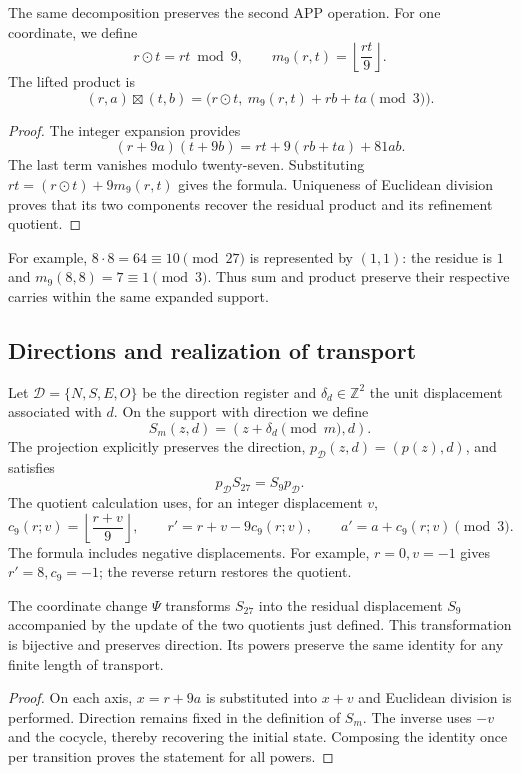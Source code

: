 The same decomposition preserves the second APP operation. For
one coordinate, we define
\[
 r\odot t=rt\bmod9,\qquad
 m_9(r,t)=\left\lfloor\frac{rt}{9}\right\rfloor.
\]
The lifted product is
\begin{equation}
 (r,a)\boxtimes(t,b)
 =\bigl(r\odot t,\ m_9(r,t)+rb+ta\pmod3\bigr).
 \label{eq:app-refinamiento-producto}
\end{equation}
\begin{proof}
The integer expansion provides
\[
 (r+9a)(t+9b)=rt+9(rb+ta)+81ab.
\]
The last term vanishes modulo twenty-seven. Substituting
$rt=(r\odot t)+9m_9(r,t)$ gives the formula. Uniqueness of Euclidean
division proves that its two components recover the residual
product and its refinement quotient.
\end{proof}
For example, $8\cdot8=64\equiv10\pmod{27}$ is represented by
$(1,1)$: the residue is $1$ and
$m_9(8,8)=7\equiv1\pmod3$. Thus sum and product preserve their
respective carries within the same expanded support.

\subsection{Directions and realization of transport}

Let $\mathcal D=\{N,S,E,O\}$ be the direction register and
$\delta_d\in\mathbb Z^2$ the unit displacement associated with $d$.
On the support with direction we define
\[
 S_m(z,d)=(z+\delta_d\pmod m,d).
\]
The projection explicitly preserves the direction,
$p_{\mathcal D}(z,d)=(p(z),d)$, and satisfies
\begin{equation}
 p_{\mathcal D}S_{27}=S_9p_{\mathcal D}.
 \label{eq:app-refinamiento-direccion}
\end{equation}
The quotient calculation uses, for an integer displacement $v$,
\[
 c_9(r;v)=\left\lfloor\frac{r+v}{9}\right\rfloor,
 \qquad r'=r+v-9c_9(r;v),\qquad
 a'=a+c_9(r;v)\pmod3.
\]
The formula includes negative displacements. For example,
$r=0,v=-1$ gives $r'=8,c_9=-1$; the reverse return restores the quotient.

\begin{proposition}
The coordinate change $\Psi$ transforms $S_{27}$ into the
residual displacement $S_9$ accompanied by the update of the
two quotients just defined. This transformation is bijective
and preserves direction. Its powers preserve the same identity
for any finite length of transport.
\end{proposition}
\begin{proof}
On each axis, $x=r+9a$ is substituted into $x+v$ and Euclidean
division is performed. Direction remains fixed in the definition of $S_m$.
The inverse uses $-v$ and the cocycle, thereby recovering the initial
state. Composing the identity once per transition proves
the statement for all powers.
\end{proof}

